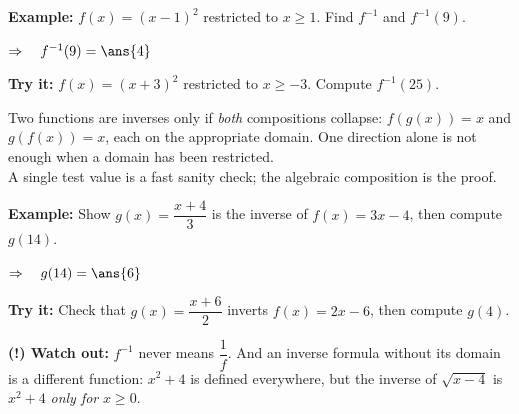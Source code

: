 \documentclass[12pt]{article}
\begin{document}
\begin{examplebox}
\textbf{Example:} $f(x) = (x - 1)^2$ restricted to $x \geq 1$. Find $f^{-1}$
and $f^{-1}(9)$.

$\Rightarrow\quad f^{-1}(9) = \ans{4}$
\end{examplebox}

\begin{tryitbox}
\textbf{Try it:} $f(x) = (x + 3)^2$ restricted to $x \geq -3$. Compute
$f^{-1}(25)$.\\[2pt]
\end{tryitbox}


\begin{formulabox}
Two functions are inverses only if \emph{both} compositions collapse:
$f(g(x)) = x$ and $g(f(x)) = x$, each on the appropriate domain. One direction
alone is not enough when a domain has been restricted.\\[3pt]
A single test value is a fast sanity check; the algebraic composition is the
proof.
\end{formulabox}

\begin{examplebox}
\textbf{Example:} Show $g(x) = \dfrac{x + 4}{3}$ is the inverse of
$f(x) = 3x - 4$, then compute $g(14)$.

$\Rightarrow\quad g(14) = \ans{6}$
\end{examplebox}

\begin{tryitbox}
\textbf{Try it:} Check that $g(x) = \dfrac{x + 6}{2}$ inverts
$f(x) = 2x - 6$, then compute $g(4)$.\\[2pt]
\end{tryitbox}

\begin{watchoutbox}
\textbf{(!) Watch out:} $f^{-1}$ never means $\dfrac{1}{f}$. And an inverse
formula without its domain is a different function: $x^2 + 4$ is defined
everywhere, but the inverse of $\sqrt{x - 4}$ is $x^2 + 4$ \emph{only for}
$x \geq 0$.
\end{watchoutbox}
\end{document}
